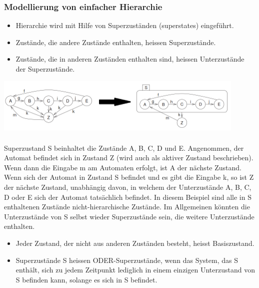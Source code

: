 \subsubsection{Modellierung von einfacher Hierarchie}
\begin{itemize}
  \item Hierarchie wird mit Hilfe von Superzuständen (superstates) eingeführt.
  \item Zustände, die andere Zustände enthalten, heissen Superzustände.
  \item Zustände, die in anderen Zuständen enthalten sind, heissen Unterzustände der Superzustände.
\end{itemize}
\includegraphics[width = 12cm]{images/FSM/Hierarchie}\\\\
Superzustand S beinhaltet die Zustände A, B, C, D und E. Angenommen, der Automat befindet sich in Zustand Z (wird auch als aktiver Zustand beschrieben). Wenn dann die Eingabe m am Automaten erfolgt, ist A der nächste Zustand. Wenn sich der Automat in Zustand S befindet und es gibt die Eingabe k, so ist Z der nächste Zustand, unabhängig davon, in welchem der Unterzustände A, B, C, D oder E sich der Automat tatsächlich befindet. In diesem Beispiel sind alle in S enthaltenen Zustände nicht-hierarchische Zustände. Im Allgemeinen könnten die Unterzustände von S selbst wieder Superzustände sein, die weitere Unterzustände enthalten.
\begin{itemize}
  \item Jeder Zustand, der nicht aus anderen Zuständen besteht, heisst Basiszustand.
  \item Superzustände S heissen ODER-Superzustände, wenn das System, das S enthält, sich zu jedem Zeitpunkt lediglich in einem einzigen Unterzustand von S befinden kann, solange es sich in S befindet.
\end{itemize}

